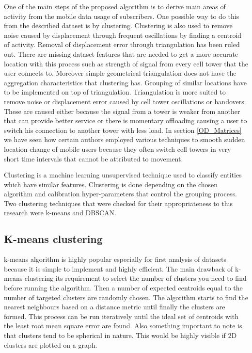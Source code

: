 \documentclass[12pt, a4paper]{report}
\theoremstyle{definition}
\theoremstyle{definition}%
\theoremstyle{definition}%
\theoremstyle{definition}%
\theoremstyle{definition}%
\theoremstyle{definition}%
\begin{document}
One of the main steps of the proposed algorithm is to derive main areas of activity from the mobile data usage of subscribers. One possible way to do this from the described dataset is by clustering. Clustering is also used to remove noise caused by displacement through frequent oscillations by finding a centroid of activity. Removal of displacement error through triangulation has been ruled out. There are missing dataset features that are needed to get a more accurate location with this process such as strength of signal from every cell tower that the user connects to. Moreover simple geometrical triangulation does not have the aggregation characteristics that clustering has. Grouping of similar locations have to be implemented on top of triangulation. Triangulation is more suited to remove noise or displacement error caused by cell tower oscillations or handovers. These are caused either because the signal from a tower is weaker from another that can provide better service or there is momentary offloading causing a user to switch his connection to another tower with less load. In section \ref{OD_Matrices} we have seen how certain authors employed various techniques to smooth sudden location change of mobile users because they often switch cell towers in very short time intervals that cannot be attributed to movement. 
 
Clustering is a machine learning unsupervised technique used to classify entities which have similar features. Clustering is done depending on the chosen algorithm and calibration hyper-parameters that control the grouping process. Two clustering techniques that were checked for their appropriateness to this research were k-means and DBSCAN. 

\subsection{K-means clustering} \label{subsection:methodology:kmeans_clustering}
k-means algorithm is highly popular especially for first analysis of datasets because it is simple to implement and highly efficient. The main drawback of k-means clustering its requirement to select the number of clusters you need to find before running the algorithm. Then a number of expected centroids equal to the number of targeted clusters are randomly chosen. The algorithm starts to find the nearest neighbours based on a distance metric until finally the clusters are formed. This process can be run iteratively until the ideal set of centroids with the least root mean square error are found. Also something important to note is that clusters tend to be spherical in nature. This would be highly visible if 2D clusters are plotted on a graph.
\end{document}
